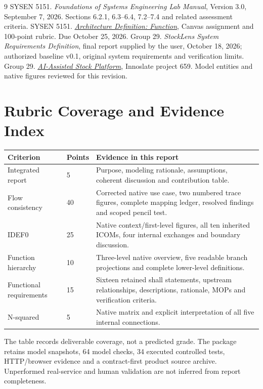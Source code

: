 \documentclass[11pt,letterpaper]{article}
\begin{document}
\begin{thebibliography}{9}
 SYSEN 5151. \textit{Foundations of Systems Engineering Lab Manual}, Version 3.0, September 7, 2026. Sections 6.2.1, 6.3--6.4, 7.2--7.4 and related assessment criteria.
 SYSEN 5151. \href{https://canvas.cornell.edu/courses/92732/assignments/981139}{\textit{Architecture Definition: Function}}, Canvas assignment and 100-point rubric. Due October 25, 2026.
 Group 29. \textit{StockLens System Requirements Definition}, final report supplied by the user, October 18, 2026; authorized baseline v0.1, original system requirements and verification limits.
 Group 29. \href{https://cloud.innoslate.com/cornell/p/659/diagrams}{\textit{AI-Assisted Stock Platform}}, Innoslate project 659. Model entities and native figures reviewed for this revision.
\end{thebibliography}
\appendix
\section{Rubric Coverage and Evidence Index}
\par\noindent\begin{tabularx}{\linewidth}{@{}p{.31\linewidth}p{.08\linewidth}X@{}}\toprule
Criterion & Points & Evidence in this report\\\midrule
Integrated report & 5 & Purpose, modeling rationale, assumptions, coherent discussion and contribution table.\\
Flow consistency & 40 & Corrected native use case, two numbered trace figures, complete mapping ledger, resolved findings and scoped pencil test.\\
IDEF0 & 25 & Native context/first-level figures, all ten inherited ICOMs, four internal exchanges and boundary discussion.\\
Function hierarchy & 10 & Three-level native overview, five readable branch projections and complete lower-level definitions.\\
Functional requirements & 15 & Sixteen retained shall statements, upstream relationships, descriptions, rationale, MOPs and verification criteria.\\
N-squared & 5 & Native matrix and explicit interpretation of all five internal connections.\\\bottomrule
\end{tabularx}\par
The table records deliverable coverage, not a predicted grade. The package retains model snapshots, 64 model checks, 34 executed controlled tests, HTTP/browser evidence and a contract-first product source archive. Unperformed real-service and human validation are not inferred from report completeness.
\end{document}
